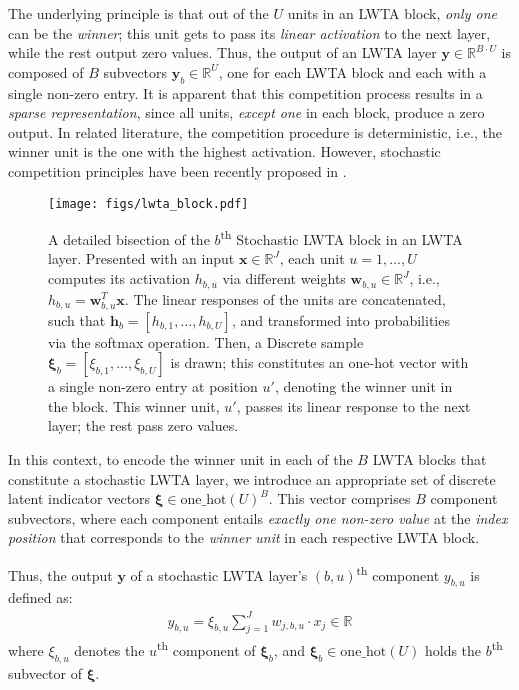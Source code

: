 \documentclass{article}
\begin{document}
	The underlying principle is that out of the $U$ units in an LWTA block, \textit{only one} can be the \textit{winner}; this unit gets to pass its \textit{linear activation} to the next layer, while the rest output zero values. Thus, the output of an LWTA layer $\boldsymbol y \in \mathbb{R}^{B\cdot U}$ is composed of $B$ subvectors $\boldsymbol y_b \in \mathbb{R}^U$, one for each LWTA block and each with a single non-zero entry. It is apparent that this competition process results in a \textit{sparse representation}, since all units, \textit{except one} in each block, produce a zero output. In related literature, the competition procedure is deterministic, i.e., the winner unit is the one with the highest activation. However, stochastic competition principles have been recently proposed in \cite{panousis2019nonparametric,panousis21a, Voskou_2021_ICCV}.
\begin{figure}
		\centering
		\texttt{[image: figs/lwta\_block.pdf]}
		\caption{A detailed bisection of the $b$\textsuperscript{th} Stochastic LWTA block in an LWTA layer. Presented with an input $\boldsymbol x\in \mathbb{R}^J$,  each unit $u=1, \dots,U$ computes its activation $h_{b,u}$ via different weights $\boldsymbol w_{b,u}\in \mathbb{R}^J$, i.e., $h_{b,u} = \boldsymbol w_{b,u}^T\boldsymbol x$. The linear responses of the units are concatenated, such that  $\boldsymbol h_b = [h_{b,1}, \dots, h_{b,U}]$, and transformed into probabilities via the softmax operation. Then, a Discrete sample $\boldsymbol \xi_b = [\xi_{b,1},\dots, \xi_{b,U}]$ is drawn; this constitutes an one-hot vector with a single non-zero entry at position $u'$, denoting the winner unit in the block. This winner unit, $u'$, passes its linear response to the next layer; the rest pass zero values.
		}
		\label{fig:block}
	\end{figure}


	In this context, to encode the winner unit in each of the $B$ LWTA blocks that constitute a stochastic LWTA layer, we introduce an appropriate set of discrete latent indicator vectors $\boldsymbol \xi \in \mathrm{one\_hot}(U)^B$. This vector comprises $B$ component subvectors, where each component entails \textit{exactly one non-zero value} at the \textit{index position} that corresponds to the \textit{winner unit} in each respective LWTA block. 
	
	Thus, the output $\boldsymbol y$ of a stochastic LWTA layer's $(b, u)$\textsuperscript{th} component $y_{b,u}$ is defined as:
\begin{align}
		y_{b,u} = \xi_{b,u} \sum_{j=1}^J w_{j,b,u} \cdot x_j \in \mathbb{R}
		\label{eqn:y}
	\end{align}
where $\xi_{b,u}$ denotes the $u$\textsuperscript{th} component of $\boldsymbol \xi_b$, and $\boldsymbol \xi_b \in \mathrm{one\_hot}(U)$ holds the $b$\textsuperscript{th} subvector of $\boldsymbol \xi$.
\end{document}
